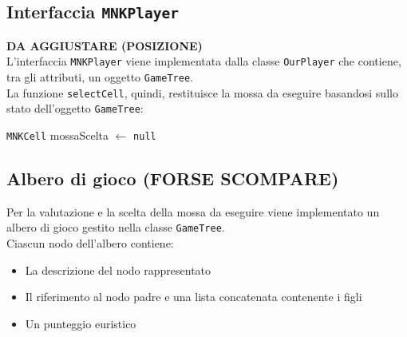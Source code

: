 \documentclass[11pt]{article}
\begin{document}
\subsection*{Interfaccia \texttt{MNKPlayer}}
\textbf{DA AGGIUSTARE (POSIZIONE)}\\
L'interfaccia \texttt{MNKPlayer} viene implementata dalla classe \texttt{OurPlayer} che contiene, tra gli attributi, un oggetto \texttt{GameTree}.\\
La funzione \texttt{selectCell}, quindi, restituisce la mossa da eseguire basandosi sullo stato dell'oggetto \texttt{GameTree}:
\begin{algorithm*}
\SetAlgoLined
\texttt{MNKCell} mossaScelta $\gets$ \texttt{null}\\
\vspace{0.2cm}
\end{algorithm*}

\subsection*{Albero di gioco (FORSE SCOMPARE)}
Per la valutazione e la scelta della mossa da eseguire viene implementato un albero di gioco gestito nella classe \texttt{GameTree}.\\
Ciascun nodo dell'albero contiene:
\begin{itemize}
\setlength\itemsep{0.05cm}
	\item La descrizione del nodo rappresentato
	\item Il riferimento al nodo padre e una lista concatenata contenente i figli
	\item Un punteggio euristico
\end{itemize}
\end{document}
